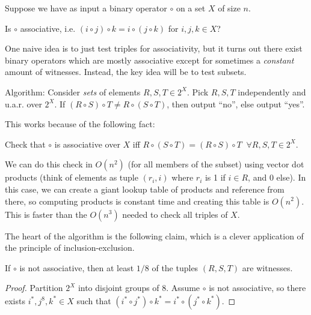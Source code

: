 \documentclass[11 pt]{scrartcl}
\begin{document}
\begin{example}
    Suppose we have as input a binary operator $\circ$ on a set $X$ of size $n$. 
    \begin{question}
        Is $\circ$ associative, i.e. $(i\circ j)\circ k = i \circ (j\circ k)$ for $i,j,k \in X$? 
    \end{question}
    One naive idea is to just test triples for associativity, but it turns out there exist binary operators which are mostly associative except for sometimes a \emph{constant} amount of witnesses. Instead, the key idea will be to test subsets. 

    Algorithm: Consider \emph{sets} of elements $R, S, T \in 2^X$. 
    Pick $R, S, T$ independently and u.a.r. over $2^X$. If $(R\circ S)\circ T \not= R\circ (S\circ T)$, then output ``no'', else output ``yes''. 

    This works because of the following fact:
    \begin{exercise}
        Check that $\circ$ is associative over $X$ iff $R\circ(S\circ T) = (R\circ S)\circ T \;\;\forall R,S,T \in 2^X$. 
    \end{exercise}


    We can do this check in $O(n^2)$ (for all members of the subset) using vector dot products (think of elements as tuple $(r_i, i)$ where $r_i$ is 1 if $i\in R$, and 0 else). In this case, we can create a giant lookup table of products and reference from there, so computing products is constant time and creating this table is $O(n^2)$. This is faster than the $O(n^3)$ needed to check all triples of $X$. 

    The heart of the algorithm is the following claim, which is a clever application of the principle of inclusion-exclusion. 
    
    \begin{claim}
        If $\circ$ is not associative, then at least $1/8$ of the tuples $(R, S, T)$ are witnesses. 
    \end{claim}
    \begin{proof}
        Partition $2^X$ into disjoint groups of 8. Assume $\circ$ is not associative, so there exists $i^*, j^8, k^* \in X$ such that $(i^*\circ j^*)\circ k^* = i^* \circ(j^* \circ k^*)$. 


\end{proof}
\end{example}
\end{document}
